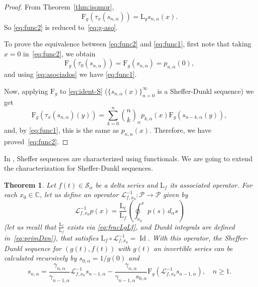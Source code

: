 \documentclass[11pt]{article}
\theoremstyle{plain}
\newtheorem{theorem}{Theorem}[section]
\theoremstyle{remark}
\numberwithin{equation}{section} %
\newcommand{\binoma}[2]{\binom{#1}{#2}_{\!\alpha}}
\newcommand{\calP}{\mathcal{P}}
\newcommand{\Sa}{\mathcal{S}_{\alpha}}
\newcommand{\CC}{\mathbb{C}}
\newcommand{\FF}{\mathrm{F}}
\newcommand{\LL}{\mathrm{L}}
\begin{document}
\begin{proof}
From Theorem~\ref{thm:isomor},
\[
\FF_g(\tau_{x}(s_{n,\alpha}))=\LL_gs_{n,\alpha}(x).
\] 
So \eqref{eq:func2} is reduced to~\eqref{eq:g-aso}.

To prove the equivalence between \eqref{eq:func2} and \eqref{eq:func1}, first note that taking $x=0$ in~\eqref{eq:func2}, we obtain
\[
\FF_g(\tau_0 (s_{n,\alpha})) = \FF_g(s_{n,\alpha}) = p_{n,\alpha}(0),
\]
and using \eqref{eq:asociados} we have \eqref{eq:func1}.

Now, applying $\FF_g$ to \eqref{eq:ident-S}  ($\{s_{n,\alpha}(x)\}_{n=0}^{\infty}$ is a Sheffer-Dunkl sequence) we get
\[
\FF_g(\tau_x(s_{n,\alpha})(y))=\sum_{k=0}^n\binoma{n}{k}p_{k,\alpha}(x)\FF_g(s_{n-k,\alpha}(y)),
\]
and, by \eqref{eq:func1}, this is the same as $p_{n,\alpha}(x)$. Therefore, we have proved~\eqref{eq:func2}.
\end{proof}


In \cite{CH}, Sheffer sequences are characterized using functionals. We are going to extend the characterization for Sheffer-Dunkl sequences.

\begin{theorem}
\label{thm:nuevo}
Let $f(t) \in \Sa$ be a delta series and $\LL_f$ its associated operator. For each $x_0 \in \CC$, let us define an operator $\mathcal{L}^{-1}_{f,x_0} : \calP \to \calP$ given by
\begin{equation}
\label{eq:oper-inver}
\mathcal{L}_{f,x_0}^{-1}p(x) = \frac{\LL_t}{\LL_f}\left(\oint_{x_0}^x p(s)\,d_{\alpha}s\right)
\end{equation}
(let us recall that $\frac{\LL_t}{\LL_f}$ exists via \eqref{eq:fracLgLf}, and Dunkl integrals are defined in~\eqref{eq:primDxn}), that satisfies $\LL_f \circ \mathcal{L}_{f,x_0}^{-1} = \operatorname{Id}$.
With this operator, the Sheffer-Dunkl sequence for $(g(t),f(t))$ with $g(t)$ an invertible series can be calculated recursively by $s_{0,\alpha} = 1/g(0)$ and
\begin{equation} 
\label{eq:recur}
s_{n,\alpha} = \frac{\gamma_{n,\alpha}}{\gamma_{n-1,\alpha}} 
\mathcal{L}_{f,x_0}^{-1} s_{n-1,\alpha}
- \frac{\gamma_{n,\alpha}}{\gamma_{n-1,\alpha}s_{0,\alpha}} 
\FF_g(\mathcal{L}_{f,x_0}^{-1} s_{n-1,\alpha}),
\quad n\ge 1. 
\end{equation}
\end{theorem}
\end{document}
